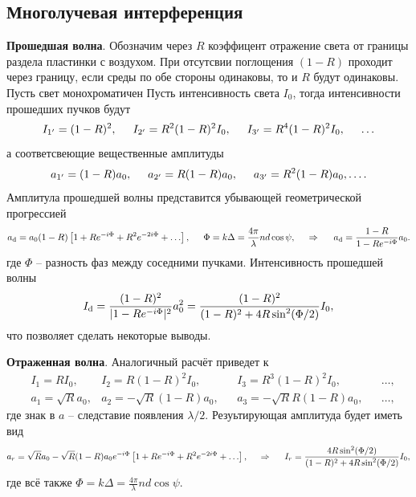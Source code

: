 \subsection{Многолучевая интерференция}


\textbf{Прошедшая волна}.
Обозначим через $R$ коэффицент отражение света от границы раздела пластинки с воздухом. При отсутсвии поглощения $(1-R)$ проходит через границу, если среды по обе стороны одинаковы, то и $R$ будут одинаковы. Пусть свет монохроматичен
Пусть интенсивность света $I_0$, тогда интенсивности прошедших пучков будут
\begin{equation*}
    I_{1'} = (1-R)^2, \hspace{5 mm} 
    I_{2'} = R^2(1-R)^2 I_0, \hspace{5 mm} 
    I_{3'} = R^4 (1-R)^2 I_0, \hspace{5 mm}  \ldots
\end{equation*}
а соответсвеющие вещественные амплитуды
\begin{equation*}
    a_{1'} = (1-R) a_0, \hspace{5 mm} 
    a_{2'} = R(1-R) a_0, \hspace{5 mm} 
    a_{3'} = R^2(1-R) a_0, \ldots .
\end{equation*}
Амплитула прошедшей волны представится убывающей геометрической прогрессией
\begin{equation*}
    a_{\textnormal{d}} = a_0 (1-R)\left[1 + R e^{-i \Phi} + R^2 e^{-2i \Phi} + \ldots\right],
    \hspace{5 mm} 
    \Phi = k \Delta = \frac{4 \pi}{\lambda} n d \cos \psi,
    \hspace{0.5cm} \Rightarrow \hspace{0.5cm}
    a_{\textnormal{d}} = \frac{1-R}{1-R e^{-i\Phi}} a_0.
\end{equation*}
где $\Phi$ -- разность фаз между соседними пучками.  Интенсивность прошедшей волны
\begin{equation*}
    I_{\textnormal{d}} = \frac{(1-R)^2}{|1-R e^{-i \Phi}|^2} a_0^2 = \frac{(1-R)^2}{(1-R)^2 + 4 R \sin^2 (\Phi/2)} I_0,
\end{equation*}
что позволяет сделать некоторые выводы. 



\textbf{Отраженная волна}. Аналогичный расчёт приведет к
\begin{align*}
    &I_1 = R I_0, 
    &I_2 = R(1-R)^2 I_0, 
    &&I_3 = R^3 (1-R)^2 I_0, 
    &&\ldots, \\ 
    &a_1 = \sqrt{R} a_0, 
    &a_2 = - \sqrt{R} (1-R) a_0, 
    &&a_3 = - \sqrt{R} R (1-R) a_0, 
    &&\ldots,
\end{align*}
где знак в $a$ -- следставие появления $\lambda/2$. Резуьтирующая амплитуда будет иметь вид
\begin{equation*}
    a_r = \sqrt{R} a_0 - \sqrt{R} (1-R) a_0 e^{-i \Phi} \left[
        1 + R e^{- i \Phi} + R^2 e^{-2i \Phi} + \ldots
    \right],
    \hspace{0.5cm} \Rightarrow \hspace{0.5cm}
    I_r = \frac{4 R \sin^2 (\Phi/2)}{(1-R)^2 + 4 R \sin^2(\Phi/2)} I_0, 
\end{equation*}
где всё также $\Phi = k \Delta = \frac{4 \pi}{\lambda} n d \cos \psi$.


